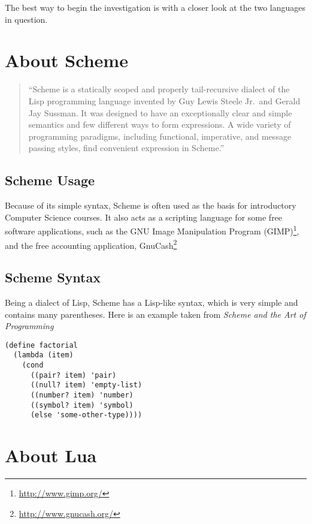 \noindent The best way to begin the investigation is with a closer look at the
two languages in question.

\section{About Scheme}

\begin{quotation}
``Scheme is a statically scoped and properly tail-recursive
dialect of the Lisp programming language invented by Guy Lewis Steele Jr.\ and
Gerald Jay Sussman. It was designed to have an exceptionally clear and simple
semantics and few different ways to form expressions. A wide variety of
programming paradigms, including functional, imperative, and message passing
styles, find convenient expression in Scheme.''~\cite{r6rs}
\end{quotation}

\subsection{Scheme Usage}

Because of its simple syntax, Scheme is often used as the basis for introductory
Computer Science courses. It also acts as a scripting language for some free
software applications, such as the GNU Image Manipulation Program
(GIMP)\footnote{\url{http://www.gimp.org/}}, and the free accounting
application, GnuCash\footnote{\url{http://www.gnucash.org/}}

\subsection{Scheme Syntax}

Being a dialect of Lisp, Scheme has a Lisp-like syntax, which is very simple and
contains many parentheses. Here is an example taken from \emph{Scheme and the
Art of Programming}~\cite[p.40]{schemebook}
\begin{framed}
\begin{verbatim}
(define factorial
  (lambda (item)
    (cond
      ((pair? item) 'pair)
      ((null? item) 'empty-list)
      ((number? item) 'number)
      ((symbol? item) 'symbol)
      (else 'some-other-type))))
\end{verbatim}
\end{framed}


\section{About Lua}

